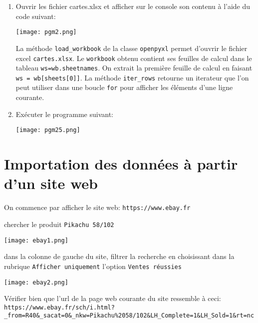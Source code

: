 \documentclass[a4paper]{article}
\begin{document}
\begin{enumerate}
\item Ouvrir les fichier cartes.xlsx et afficher sur le console son contenu à l'aide du code suivant:

\begin{center}
\texttt{[image: pgm2.png]} 
\end{center}


%
%

La méthode {\tt load\_workbook} de la classe {\tt openpyxl} permet d'ouvrir le fichier excel {\tt cartes.xlsx}. Le {\tt workbook} obtenu contient ses feuilles de calcul dans le tableau {\tt ws=wb.sheetnames}. On extrait la première feuille de calcul en faisant {\tt ws = wb[sheets[0]]}. La méthode {\tt iter\_rows} retourne un iterateur que l'on peut utiliser dans une boucle {\tt for} pour afficher les éléments d'une ligne courante.
\item Exécuter le programme suivant:
\begin{center}
\texttt{[image: pgm25.png]} 
\end{center}


%
%
%

\end{enumerate}
\section{Importation des données à partir d'un site web}
On commence  par afficher le site web: {\tt https://www.ebay.fr}

chercher le produit {\tt Pikachu 58/102}

\begin{center}
\texttt{[image: ebay1.png]} 
\end{center}
dans la colonne de gauche du site, filtrer la recherche en choisissant dans la rubrique {\tt Afficher uniquement} l'option {\tt Ventes réussies}
\begin{center}
\texttt{[image: ebay2.png]} 
\end{center}
Vérifier bien que l'url de la page web courante du site ressemble à ceci:\\
{\tt https://www.ebay.fr/sch/i.html?\_from=R40\&\_sacat=0\&\_nkw=Pikachu\%2058/102\&LH\_Complete=1\&LH\_Sold=1\&rt=nc}
\end{document}
